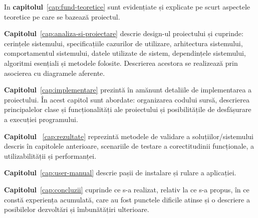 In \textbf{capitolul}~\ref{cap:fund-teoretice}  sunt evidențiate și explicate pe scurt aspectele teoretice pe care se bazează proiectul.

\textbf{Capitolul}~\ref{cap:analiza-si-proiectare}  descrie design-ul proiectului și cuprinde: cerințele sistemului, specificațiile cazurilor de utilizare, arhitectura sistemului, comportamentul sistemului, datele utilizate de sistem, dependințele sistemului, algoritmi esențiali și metodele folosite. Descrierea acestora se realizează prin asocierea cu diagramele aferente.


\textbf{Capitolul}~\ref{cap:implementare}  prezintă în amănunt detaliile de implementarea a proiectului. În acest capitol sunt abordate: organizarea codului sursă, descrierea principalelor clase și funcționalități ale proiectului și posibilitățile de desfășurare a execuției programului. 

\textbf{Capitolul} ~\ref{cap:rezultate}  reprezintă metodele de validare a soluțiilor/sistemului descris în capitolele anterioare, scenariile de testare a corectitudinii funcționale, a utilizabilității și performanței. 

\textbf{Capitolul}~\ref{cap:user-manual} descrie pașii de instalare și rulare a aplicației.

\textbf{Capitolul}~\ref{cap:concluzii} cuprinde ce s-a realizat, relativ la ce s-a propus, în ce constă experiența acumulată, care au fost punctele dificile atinse și o descriere a posibilelor dezvoltări și îmbunătățiri ulterioare.